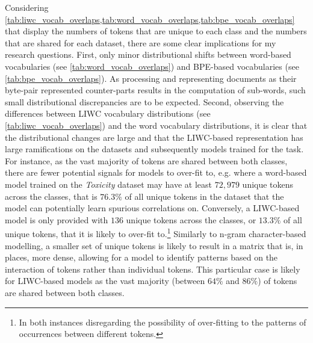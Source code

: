 \begin{table}[h]
\centering
{}
\caption{Number of unique BPE tokens in each class for each dataset and the size of their intersection.}
\label{tab:bpe_vocab_overlaps}
\end{table}

Considering \cref{tab:liwc_vocab_overlaps,tab:word_vocab_overlaps,tab:bpe_vocab_overlaps} that display the numbers of tokens that are unique to each class and the numbers that are shared for each dataset, there are some clear implications for my research questions.
First, only minor distributional shifts between word-based vocabularies (see \cref{tab:word_vocab_overlaps}) and BPE-based vocabularies (see \cref{tab:bpe_vocab_overlaps}). As processing and representing documents as their byte-pair represented counter-parts results in the computation of sub-words, such small distributional discrepancies are to be expected.
Second, observing the differences between LIWC vocabulary distributions (see \cref{tab:liwc_vocab_overlaps}) and the word vocabulary distributions, it is clear that the distributional changes are large and that the LIWC-based representation has large ramifications on the datasets and subsequently models trained for the task.
For instance, as the vast majority of tokens are shared between both classes, there are fewer potential signals for models to over-fit to, e.g. where a word-based model trained on the \textit{Toxicity} dataset may have at least $72,979$ unique tokens across the classes, that is $76.3\%$ of all unique tokens in the dataset that the model can potentially learn spurious correlations on.
Conversely, a LIWC-based model is only provided with $136$ unique tokens across the classes, or $13.3\%$ of all unique tokens, that it is likely to over-fit to.\footnote{In both instances disregarding the possibility of over-fitting to the patterns of occurrences between different tokens.}
Similarly to n-gram character-based modelling, a smaller set of unique tokens is likely to result in a matrix that is, in places, more dense, allowing for a model to identify patterns based on the interaction of tokens rather than individual tokens. This particular case is likely for LIWC-based models as the vast majority (between $64\%$ and $86\%$) of tokens are shared between both classes.

